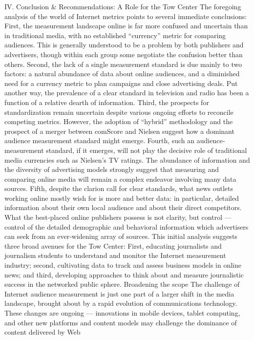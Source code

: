 IV. Conclusion & Recommendations: A Role for the Tow Center
The foregoing analysis of the world of Internet metrics points to several
immediate conclusions:
First, the measurement landscape online is far more confused and
uncertain than in traditional media, with no established ``currency'' metric
for comparing audiences. This is generally understood to be a problem by
both publishers and advertisers, though within each group some negotiate
the confusion better than others.
Second, the lack of a single measurement standard is due mainly to two
factors: a natural abundance of data about online audiences, and a
diminished need for a currency metric to plan campaigns and close
advertising deals. Put another way, the prevalence of a clear standard in
television and radio has been a function of a relative dearth of
information.
Third, the prospects for standardization remain uncertain despite various
ongoing efforts to reconcile competing metrics. However, the adoption of
``hybrid'' methodology and the prospect of a merger between comScore
and Nielsen suggest how a dominant audience measurement standard
might emerge.
Fourth, such an audience‐measurement standard, if it emerges, will not
play the decisive role of traditional media currencies such as Nielsen’s TV
ratings. The abundance of information and the diversity of advertising
models strongly suggest that measuring and comparing online media will
remain a complex endeavor involving many data sources.
Fifth, despite the clarion call for clear standards, what news outlets
working online mostly wish for is more and better data: in particular,
detailed information about their own local audience and about their direct
competitors. What the best‐placed online publishers possess is not clarity,
but control — control of the detailed demographic and behavioral
information which advertisers can seek from an ever‐widening array of
sources.
This initial analysis suggests three broad avenues for the Tow Center:
First, educating journalists and journalism students to understand and
monitor the Internet measurement industry; second, cultivating data to
track and assess business models in online news; and third, developing
approaches to think about and measure journalistic success in the
networked public sphere.
Broadening the scope
The challenge of Internet audience measurement is just one part of a
larger shift in the media landscape, brought about by a rapid evolution of
communications technology. These changes are ongoing — innovations in
mobile devices, tablet computing, and other new platforms and content
models may challenge the dominance of content delivered by Web
